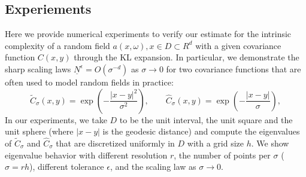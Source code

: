 \documentclass[11pt]{amsart}
\begin{document}
\subsection{Experiements}
\label{sec:test}

Here we provide numerical experiments to verify our estimate for the intrinsic complexity of a random field $a(x,\omega), x\in D\subset R^d$ with a given covariance function $C(x,y)$ through the KL expansion. In particular, we demonstrate the sharp scaling laws $\underline{N}^{\epsilon}=O(\sigma^{-d})$ as $\sigma\rightarrow 0$ for two covariance functions that are often used to model  random fields in practice:
\begin{equation}
\label{eq:kernel}
\tilde{C}_{\sigma}(x,y)=\exp\left(-\frac{|x-y|^2}{\sigma^2}\right),  \quad \quad \hat{C}_{\sigma}(x,y)=\exp\left(-\frac{|x-y|}{\sigma}\right), 
\end{equation}
In our experiments, we take $D$ to be the unit interval, the unit square and the unit sphere (where $|x-y|$ is the geodesic distance) and 
compute the eigenvalues of $\tilde{C}_{\sigma}$ and $\hat{C}_{\sigma}$ that are discretized uniformly in $D$ with a grid size $h$.
We show eigenvalue behavior with different resolution $r$, the number of points per $\sigma$ ($\sigma=rh$), different tolerance $\epsilon$, and the scaling law as $\sigma\rightarrow 0$.
\end{document}

